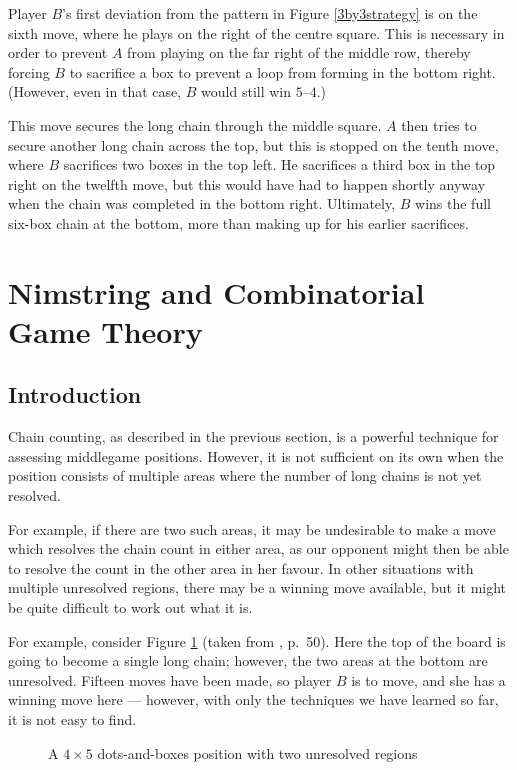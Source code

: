 \documentclass[a4paper,twocolumn]{article}
\begin{document}
Player $B$'s first deviation from the pattern in Figure
\ref{3by3strategy} is on the sixth move, where he plays on the right
of the centre square. This is necessary in order to prevent $A$ from
playing on the far right of the middle row, thereby forcing $B$ to
sacrifice a box to prevent a loop from forming in the bottom
right. (However, even in that case, $B$ would still win $5$--$4$.)

This move secures the long chain through the middle square. $A$ then
tries to secure another long chain across the top, but this is stopped
on the tenth move, where $B$ sacrifices two boxes in the top left. He
sacrifices a third box in the top right on the twelfth move, but this
would have had to happen shortly anyway when the chain was completed
in the bottom right. Ultimately, $B$ wins the full six-box chain at
the bottom, more than making up for his earlier sacrifices.

\section{Nimstring and Combinatorial Game Theory}

\subsection{Introduction}

Chain counting, as described in the previous section, is a powerful
technique for assessing middlegame positions. However, it is not
sufficient on its own when the position consists of multiple areas
where the number of long chains is not yet resolved.

For example, if there are two such areas, it may be undesirable to
make a move which resolves the chain count in either area, as our
opponent might then be able to resolve the count in the other area in
her favour. In other situations with multiple unresolved regions,
there may be a winning move available, but it might be quite difficult
to work out what it is.

For example, consider Figure \ref{nimstringmotivation} (taken from
\cite{berl}, p.\ 50). Here the top of the board is going to become a
single long chain; however, the two areas at the bottom are
unresolved. Fifteen moves have been made, so player $B$ is to move,
and she has a winning move here --- however, with only the techniques
we have learned so far, it is not easy to find.

\begin{figure}
  \centering
  \def\svgscale{0.7}
  
  \caption{A $4 \times 5$ dots-and-boxes position with two
    unresolved regions}
  \label{nimstringmotivation}
\end{figure}
\end{document}
